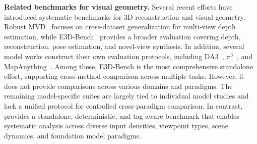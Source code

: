 \textbf{Related benchmarks for visual geometry.}
Several recent efforts have introduced systematic benchmarks for 3D reconstruction and visual geometry. Robust MVD~\citep{schroeppel2022rmvd} focuses on cross-dataset generalization for multi-view depth estimation, while E3D-Bench~\citep{cong2025e3d} provides a broader evaluation covering depth, reconstruction, pose estimation, and novel-view synthesis.
%
In addition, several model works construct their own evaluation protocols, including DA3~\citep{lin2025depth}, $\pi^3$~\citep{wang2025pi3}, and MapAnything~\citep{keetha2026mapanything}.
%
Among these, E3D-Bench is the most comprehensive standalone effort, supporting cross-method comparison across multiple tasks. 
%
However, it does not provide comparisons across various domains and paradigms.
%
The remaining model-specific suites are largely tied to individual model studies and lack a unified protocol for controlled cross-paradigm comparison.
%
In contrast, \benchmark provides a standalone, deterministic, and tag-aware benchmark that enables systematic analysis across diverse input densities, viewpoint types, scene dynamics, and foundation model paradigms.